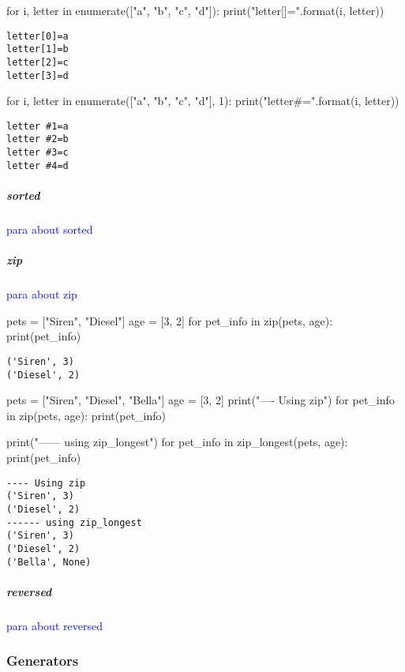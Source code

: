 \begin{python}
for i, letter in enumerate(["a", "b", "c", "d"]):
    print("letter[{}]={}".format(i, letter))
\end{python}
\begin{lstlisting}[style=pyOutStyle]
letter[0]=a
letter[1]=b
letter[2]=c
letter[3]=d
\end{lstlisting}


\begin{python}
for i, letter in enumerate(["a", "b", "c", "d"], 1):
    print("letter#{}={}".format(i, letter))
\end{python}
\begin{lstlisting}[style=pyOutStyle]
letter #1=a
letter #2=b
letter #3=c
letter #4=d
\end{lstlisting}

\subparagraph{sorted}

\textcolor{blue}{para about sorted}

\subparagraph{zip}

\textcolor{blue}{para about zip}

\begin{python}
pets = ["Siren", "Diesel"]
age = [3, 2]
for pet_info in zip(pets, age):
    print(pet_info)
\end{python}
\begin{lstlisting}[style=pyOutStyle]
('Siren', 3)
('Diesel', 2)
\end{lstlisting}


\begin{python}
pets = ["Siren", "Diesel", "Bella"]
age = [3, 2]
print("---- Using zip")
for pet_info in zip(pets, age):
    print(pet_info)

print("------ using zip_longest")
for pet_info in zip_longest(pets, age):
    print(pet_info)
\end{python}
\begin{lstlisting}[style=pyOutStyle]
---- Using zip
('Siren', 3)
('Diesel', 2)
------ using zip_longest
('Siren', 3)
('Diesel', 2)
('Bella', None)
\end{lstlisting}

\subparagraph{reversed}

\textcolor{blue}{para about reversed}

\subsubsection{Generators}

